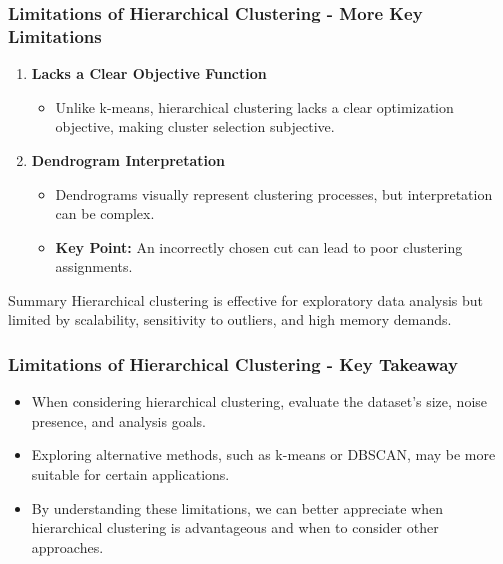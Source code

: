 \documentclass[aspectratio=169]{beamer}
\begin{document}
\begin{frame}[fragile]
    \frametitle{Limitations of Hierarchical Clustering - More Key Limitations}
    \begin{enumerate}[resume]
        \item \textbf{Lacks a Clear Objective Function}
            \begin{itemize}
                \item Unlike k-means, hierarchical clustering lacks a clear optimization objective, making cluster selection subjective.
            \end{itemize}
        
        \item \textbf{Dendrogram Interpretation}
            \begin{itemize}
                \item Dendrograms visually represent clustering processes, but interpretation can be complex.
                \item \textbf{Key Point:} An incorrectly chosen cut can lead to poor clustering assignments.
            \end{itemize}
    \end{enumerate}
    
    \begin{block}{Summary}
        Hierarchical clustering is effective for exploratory data analysis but limited by scalability, sensitivity to outliers, and high memory demands.
    \end{block}
\end{frame}

\begin{frame}[fragile]
    \frametitle{Limitations of Hierarchical Clustering - Key Takeaway}
    \begin{itemize}
        \item When considering hierarchical clustering, evaluate the dataset's size, noise presence, and analysis goals.
        \item Exploring alternative methods, such as k-means or DBSCAN, may be more suitable for certain applications.
        
        \item By understanding these limitations, we can better appreciate when hierarchical clustering is advantageous and when to consider other approaches.
    \end{itemize}
\end{frame}
\end{document}
